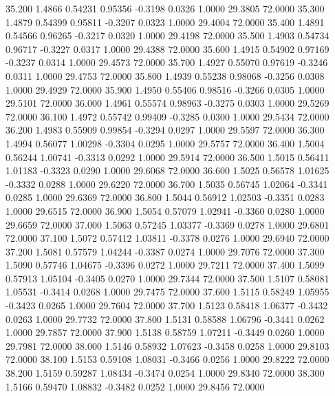   35.200   1.4866   0.54231   0.95356  -0.3198   0.0326   1.0000  29.3805  72.0000
  35.300   1.4879   0.54399   0.95811  -0.3207   0.0323   1.0000  29.4004  72.0000
  35.400   1.4891   0.54566   0.96265  -0.3217   0.0320   1.0000  29.4198  72.0000
  35.500   1.4903   0.54734   0.96717  -0.3227   0.0317   1.0000  29.4388  72.0000
  35.600   1.4915   0.54902   0.97169  -0.3237   0.0314   1.0000  29.4573  72.0000
  35.700   1.4927   0.55070   0.97619  -0.3246   0.0311   1.0000  29.4753  72.0000
  35.800   1.4939   0.55238   0.98068  -0.3256   0.0308   1.0000  29.4929  72.0000
  35.900   1.4950   0.55406   0.98516  -0.3266   0.0305   1.0000  29.5101  72.0000
  36.000   1.4961   0.55574   0.98963  -0.3275   0.0303   1.0000  29.5269  72.0000
  36.100   1.4972   0.55742   0.99409  -0.3285   0.0300   1.0000  29.5434  72.0000
  36.200   1.4983   0.55909   0.99854  -0.3294   0.0297   1.0000  29.5597  72.0000
  36.300   1.4994   0.56077   1.00298  -0.3304   0.0295   1.0000  29.5757  72.0000
  36.400   1.5004   0.56244   1.00741  -0.3313   0.0292   1.0000  29.5914  72.0000
  36.500   1.5015   0.56411   1.01183  -0.3323   0.0290   1.0000  29.6068  72.0000
  36.600   1.5025   0.56578   1.01625  -0.3332   0.0288   1.0000  29.6220  72.0000
  36.700   1.5035   0.56745   1.02064  -0.3341   0.0285   1.0000  29.6369  72.0000
  36.800   1.5044   0.56912   1.02503  -0.3351   0.0283   1.0000  29.6515  72.0000
  36.900   1.5054   0.57079   1.02941  -0.3360   0.0280   1.0000  29.6659  72.0000
  37.000   1.5063   0.57245   1.03377  -0.3369   0.0278   1.0000  29.6801  72.0000
  37.100   1.5072   0.57412   1.03811  -0.3378   0.0276   1.0000  29.6940  72.0000
  37.200   1.5081   0.57579   1.04244  -0.3387   0.0274   1.0000  29.7076  72.0000
  37.300   1.5090   0.57746   1.04675  -0.3396   0.0272   1.0000  29.7211  72.0000
  37.400   1.5099   0.57913   1.05104  -0.3405   0.0270   1.0000  29.7344  72.0000
  37.500   1.5107   0.58081   1.05531  -0.3414   0.0268   1.0000  29.7475  72.0000
  37.600   1.5115   0.58249   1.05955  -0.3423   0.0265   1.0000  29.7604  72.0000
  37.700   1.5123   0.58418   1.06377  -0.3432   0.0263   1.0000  29.7732  72.0000
  37.800   1.5131   0.58588   1.06796  -0.3441   0.0262   1.0000  29.7857  72.0000
  37.900   1.5138   0.58759   1.07211  -0.3449   0.0260   1.0000  29.7981  72.0000
  38.000   1.5146   0.58932   1.07623  -0.3458   0.0258   1.0000  29.8103  72.0000
  38.100   1.5153   0.59108   1.08031  -0.3466   0.0256   1.0000  29.8222  72.0000
  38.200   1.5159   0.59287   1.08434  -0.3474   0.0254   1.0000  29.8340  72.0000
  38.300   1.5166   0.59470   1.08832  -0.3482   0.0252   1.0000  29.8456  72.0000
